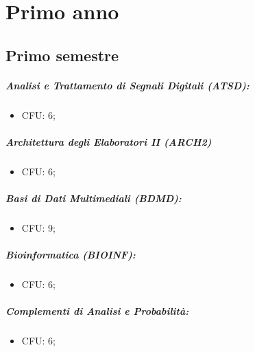 \chapter{Primo anno}

\section{Primo semestre}  

\paragraph{Analisi e Trattamento di Segnali Digitali (ATSD):}

\begin{itemize}
  \item CFU: 6;
\end{itemize}

\paragraph{Architettura degli Elaboratori II (ARCH2)}

\begin{itemize}
  \item CFU: 6;
\end{itemize}

\paragraph{Basi di Dati Multimediali (BDMD):}

\begin{itemize}
  \item CFU: 9;
\end{itemize}

\paragraph{Bioinformatica (BIOINF):}

\begin{itemize}
  \item CFU: 6;
\end{itemize}

\paragraph{Complementi di Analisi e Probabilità:}

\begin{itemize}
  \item CFU: 6;
\end{itemize}

